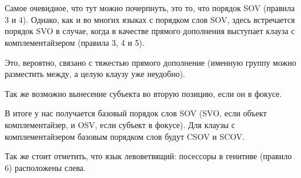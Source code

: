 \documentclass[11pt]{article}
\begin{document}
\section{}
Самое очевидное, что тут можно почерпнуть, это то, что порядок SOV (правила 3 и 4). Однако, как и во многих языках с порядком слов SOV, здесь встречается порядок SVO в случае, когда в качестве прямого дополнения выступает клауза с комплементайзером (правила 3, 4 и 5).

Это, вероятно, связано с тяжестью прямого дополнение (именную группу можно разместить между, а целую клаузу уже неудобно).

Так же возможно вынесение субъекта во вторую позицию, если он в фокусе.

В итоге у нас получается базовый порядок слов SOV (SVO, если объект комплементайзер, и OSV, если субъект в фокусе). Для клаузы с комплементайзером базовым порядком слов будут CSOV и SCOV.

Так же стоит отметить, что язык левоветвящий: посессоры в генитиве (правило 6) расположены слева.
\end{document}
